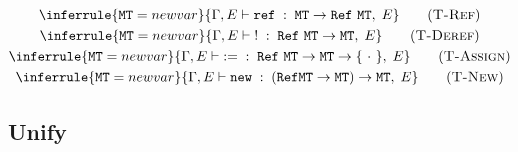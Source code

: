 \documentclass{report}
\newcommand{\code}{\mathtt}
\newcommand{\ruleTag}[1]{\label{#1}\tag{\textsc{#1}}}
\newcommand{\newVariable}{newvar}
\newcommand{\entails}{\vdash}
\newcommand{\typingRelation}[5]{#1, #2 \entails #3 \;:\; #4 ,\; #5}
\begin{document}
\begin{gather}
\\
\inferrule
{\code{MT} = \newVariable}
{\typingRelation{\Gamma}{E}{\code{ref}}{\code{MT}\rightarrow\code{Ref}\ \code{MT}}{E}}
\ruleTag{T-Ref}
\\
\inferrule
{\code{MT} = \newVariable}
{\typingRelation{\Gamma}{E}{\code{!}}{\code{Ref}\ \code{MT}\rightarrow\code{MT}}{E}}
\ruleTag{T-Deref}
\\
\inferrule
{\code{MT} = \newVariable}
{\typingRelation{\Gamma}{E}{\code{:=}}{\code{Ref}\ \code{MT}\rightarrow\code{MT}\rightarrow\{\ \cdot\ \}}{E}}
\ruleTag{T-Assign}
\\
\inferrule
{\code{MT} = \newVariable}
{\typingRelation{\Gamma}{E}{\code{new}}{(\code{Ref} \code{MT}\rightarrow\code{MT})\rightarrow\code{MT}}{E}}
\ruleTag{T-New}
\end{gather}

\subsection{Unify}
\end{document}
